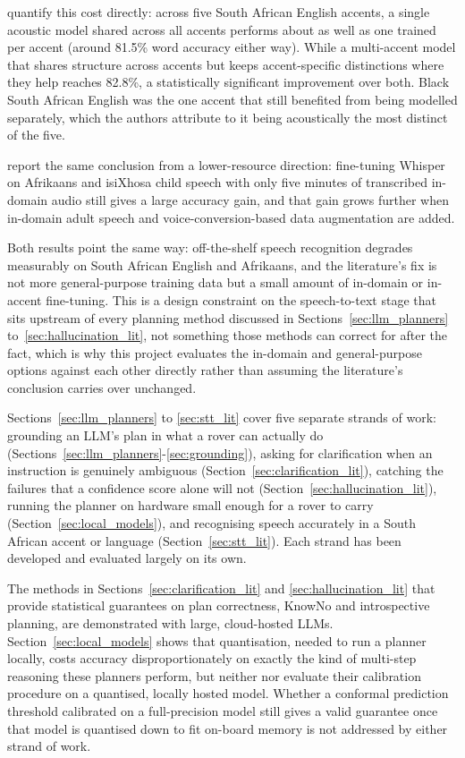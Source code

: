 \citet{kamper2012multiaccent} quantify this cost directly: across five South African English
accents, a single acoustic model shared across all accents performs about as well as one trained
per accent (around 81.5\% word accuracy either way). While a multi-accent model that shares
structure across accents but keeps accent-specific distinctions where they help reaches 82.8\%, a
statistically significant improvement over both. Black South African English was the one accent
that still benefited from being modelled separately, which the authors attribute to it being
acoustically the most distinct of the five.

\citet{jacobs2025afrikaans} report the same conclusion from a lower-resource direction:
fine-tuning Whisper on Afrikaans and isiXhosa child speech with only five minutes of transcribed
in-domain audio still gives a large accuracy gain, and that gain grows further when in-domain
adult speech and voice-conversion-based data augmentation are added.

Both results point the same way: off-the-shelf speech recognition degrades measurably on South
African English and Afrikaans, and the literature's fix is not more general-purpose training data
but a small amount of in-domain or in-accent fine-tuning. This is a design constraint on the
speech-to-text stage that sits upstream of every planning method discussed in
Sections~\ref{sec:llm_planners} to~\ref{sec:hallucination_lit}, not something those methods can
correct for after the fact, which is why this project evaluates the in-domain and general-purpose
options against each other directly rather than assuming the literature's conclusion carries over
unchanged.
\label{sec:gap}

Sections~\ref{sec:llm_planners} to \ref{sec:stt_lit} cover five separate strands of work: grounding an LLM's 
plan in what a rover can actually do (Sections~\ref{sec:llm_planners}-\ref{sec:grounding}), 
asking for clarification when an instruction is genuinely ambiguous (Section~\ref{sec:clarification_lit}), 
catching the failures that a confidence score alone will not (Section~\ref{sec:hallucination_lit}), 
running the planner on hardware small enough for a rover to carry (Section~\ref{sec:local_models}), 
and recognising speech accurately in a South African accent or language (Section~\ref{sec:stt_lit}).
Each strand has been developed and evaluated largely on its own.

The methods in Sections~\ref{sec:clarification_lit} and \ref{sec:hallucination_lit} that provide statistical 
guarantees on plan correctness, KnowNo and introspective planning, are demonstrated with large, 
cloud-hosted LLMs. Section~\ref{sec:local_models} shows that quantisation, needed to run a planner 
locally, costs accuracy disproportionately on exactly the kind of multi-step reasoning these planners perform, 
but neither \citet{ren2023knowno} nor \citet{liang2024introspective} evaluate their calibration procedure 
on a quantised, locally hosted model. Whether a conformal prediction threshold calibrated on a full-precision 
model still gives a valid guarantee once that model is quantised down to fit on-board memory is not addressed 
by either strand of work.

